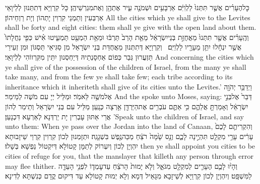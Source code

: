 {כׇּל\maqqaf הֶעָרִ֗ים אֲשֶׁ֤ר תִּתְּנוּ֙ לַלְוִיִּ֔ם אַרְבָּעִ֥ים וּשְׁמֹנֶ֖ה עִ֑יר אֶתְהֶ֖ן וְאֶת\maqqaf מִגְרְשֵׁיהֶֽן׃}
{כָּל קִרְוַיָּא דְּתִתְּנוּן לְלֵיוָאֵי אַרְבְּעִין וְתַמְנֵי קִרְוִין יָתְהוֹן וְיָת רַוְחֵיהוֹן׃}
{All the cities which ye shall give to the Levites shall be forty and eight cities: them shall ye give with the open land about them.}{}
{וְהֶֽעָרִ֗ים אֲשֶׁ֤ר תִּתְּנוּ֙ מֵאֲחֻזַּ֣ת בְּנֵי\maqqaf יִשְׂרָאֵ֔ל מֵאֵ֤ת הָרַב֙ תַּרְבּ֔וּ וּמֵאֵ֥ת הַמְעַ֖ט תַּמְעִ֑יטוּ אִ֗ישׁ כְּפִ֤י נַחֲלָתוֹ֙ אֲשֶׁ֣ר יִנְחָ֔לוּ יִתֵּ֥ן מֵעָרָ֖יו לַלְוִיִּֽם׃ \petucha }
{וְקִרְוַיָּא דְּתִתְּנוּן מֵאֲחֻדַּת בְּנֵי יִשְׂרָאֵל מִן סַגִּיאֵי תַּסְגּוֹן וּמִן זְעֵירֵי תַּזְעֲרוּן גְּבַר כְּפוֹם אַחְסָנְתֵיהּ דְּיַחְסְנוּן יִתֵּין מִקִּרְווֹהִי לְלֵיוָאֵי׃}
{And concerning the cities which ye shall give of the possession of the children of Israel, from the many ye shall take many, and from the few ye shall take few; each tribe according to its inheritance which it inheriteth shall give of its cities unto the Levites.’}{}
{וַיְדַבֵּ֥ר יְהֹוָ֖ה אֶל\maqqaf מֹשֶׁ֥ה לֵּאמֹֽר׃}
{וּמַלֵּיל יְיָ עִם מֹשֶׁה לְמֵימַר׃}
{And the \lord\space spoke unto Moses, saying:}{}
{דַּבֵּר֙ אֶל\maqqaf בְּנֵ֣י יִשְׂרָאֵ֔ל וְאָמַרְתָּ֖ אֲלֵהֶ֑ם כִּ֥י אַתֶּ֛ם עֹבְרִ֥ים אֶת\maqqaf הַיַּרְדֵּ֖ן אַ֥רְצָה כְּנָֽעַן׃}
{מַלֵּיל עִם בְּנֵי יִשְׂרָאֵל וְתֵימַר לְהוֹן אֲרֵי אַתּוּן עָבְרִין יָת יַרְדְּנָא לְאַרְעָא דִּכְנָעַן׃}
{’Speak unto the children of Israel, and say unto them: When ye pass over the Jordan into the land of Canaan,}{}
{וְהִקְרִיתֶ֤ם לָכֶם֙ עָרִ֔ים עָרֵ֥י מִקְלָ֖ט תִּהְיֶ֣ינָה לָכֶ֑ם וְנָ֥ס שָׁ֙מָּה֙ רֹצֵ֔חַ מַכֵּה\maqqaf נֶ֖פֶשׁ בִּשְׁגָגָֽה׃}
{וּתְזָמְנוּן לְכוֹן קִרְוִין קִרְוֵי שֵׁיזָבוּתָא יִהְוְיָן לְכוֹן וְיִעְרוֹק לְתַמָּן קָטוֹלָא דְּיִקְטוֹל נַפְשָׁא בְּשָׁלוּ׃}
{then ye shall appoint you cities to be cities of refuge for you, that the manslayer that killeth any person through error may flee thither.}{}
{וְהָי֨וּ לָכֶ֧ם הֶעָרִ֛ים לְמִקְלָ֖ט מִגֹּאֵ֑ל וְלֹ֤א יָמוּת֙ הָרֹצֵ֔חַ עַד\maqqaf עׇמְד֛וֹ לִפְנֵ֥י הָעֵדָ֖ה לַמִּשְׁפָּֽט׃}
{וְיִהְוְיָן לְכוֹן קִרְוַיָּא לְשֵׁיזָבָא מִגָּאֵיל דְּמָא וְלָא יְמוּת קָטוֹלָא עַד דִּיקוּם קֳדָם כְּנִשְׁתָּא לְדִינָא׃}
